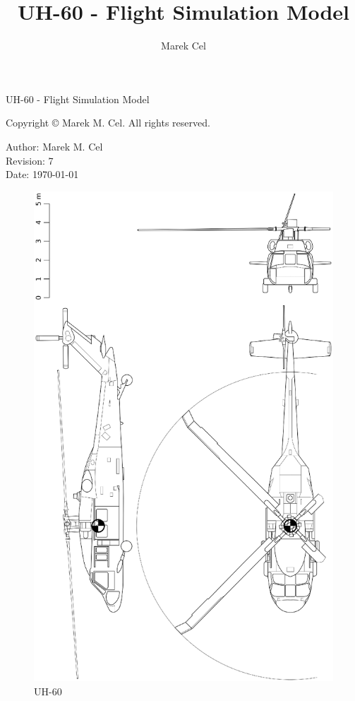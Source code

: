 \documentclass[12pt,a4paper]{article}
\title{UH-60 - Flight Simulation Model}
\author{Marek Cel}
\date{}
\begin{document}
  
  \begin{titlepage}
    \centering
    {\huge UH-60 - Flight Simulation Model\par}
  \end{titlepage}
  

  \noindent Copyright \copyright{} \the\year{} Marek M. Cel. All rights reserved.

  \noindent Author: Marek M. Cel \\
  Revision: 7 \\
  Date: \today

  
  
  \clearpage
  
  \begin{figure}[p]
    \centering
    \includegraphics[width=160mm]{eps/uh60_3view.eps}
    \caption{UH-60}
  \end{figure}
\end{document}
